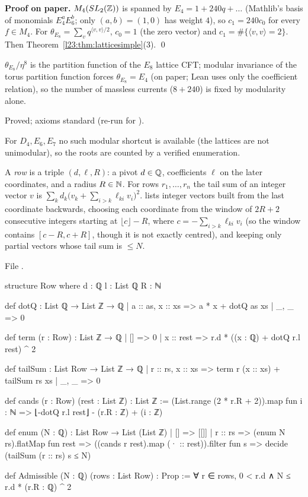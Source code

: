 \textbf{Proof on paper.} $M_4(SL_2({\mathbb{Z}}))$ is spanned by $E_4=1+240q+\dots$ (Mathlib's basis of monomials $E_4^aE_6^b$; only $(a,b)=(1,0)$
has weight $4$), so $c_1=240c_0$ for every $f\in M_4$. For $\theta_{E_8}=\sum_v q^{\langle v,v\rangle/2}$, $c_0=1$ (the zero vector) and
$c_1=\#\{\langle v,v\rangle=2\}$. Then Theorem~\ref{l23:thm:latticesimple}(3). \qed

\begin{physics}
$\theta_{E_8}/\eta^8$ is the partition function of the $E_8$ lattice CFT; modular invariance of the torus partition function forces
$\theta_{E_8}=E_4$ (on paper; Lean uses only the coefficient relation), so the number of massless currents ($8+240$) is fixed by
modularity alone.
\end{physics}

\begin{status}
Proved; axioms standard (re-run for ).
\end{status}

For $D_4,E_6,E_7$ no such modular shortcut is available (the lattices are not unimodular), so the roots are counted by a verified
enumeration.

\begin{definition}\label{l23:def:enum}
A \emph{row} is a triple $(d,\ell,R)$: a pivot $d\in{\mathbb{Q}}$, coefficients $\ell$ on the later coordinates, and a radius $R\in{\mathbb{N}}$. For rows
$r_1,\dots,r_n$ the tail sum of an integer vector $v$ is $\sum_k d_k\big(v_k+\sum_{i>k}\ell_{ki}v_i\big)^2$.  lists
integer vectors built from the last coordinate backwards, choosing each coordinate from the window of $2R+2$ consecutive integers starting at $\lfloor c\rfloor-R$, where
$c=-\sum_{i>k}\ell_{ki}v_i$ (so the window contains $[c-R,c+R]$, though it is not exactly centred), and keeping only partial vectors whose tail sum is $\le N$.
\end{definition}
\noindent File .
\begin{leancode}
structure Row where
  d : ℚ
  l : List ℚ
  R : ℕ

def dotQ : List ℚ → List ℤ → ℚ
  | a :: as, x :: xs => a * x + dotQ as xs
  | _, _ => 0

def term (r : Row) : List ℤ → ℚ
  | [] => 0
  | x :: rest => r.d * ((x : ℚ) + dotQ r.l rest) ^ 2

def tailSum : List Row → List ℤ → ℚ
  | r :: rs, x :: xs => term r (x :: xs) + tailSum rs xs
  | _, _ => 0

def cands (r : Row) (rest : List ℤ) : List ℤ :=
  (List.range (2 * r.R + 2)).map fun i : ℕ => ⌊-dotQ r.l rest⌋ - (r.R : ℤ) + (i : ℤ)

def enum (N : ℚ) : List Row → List (List ℤ)
  | [] => [[]]
  | r :: rs => (enum N rs).flatMap fun rest =>
      ((cands r rest).map (· :: rest)).filter fun s => decide (tailSum (r :: rs) s ≤ N)

def Admissible (N : ℚ) (rows : List Row) : Prop := ∀ r ∈ rows, 0 < r.d ∧ N ≤ r.d * (r.R : ℚ) ^ 2
\end{leancode}

